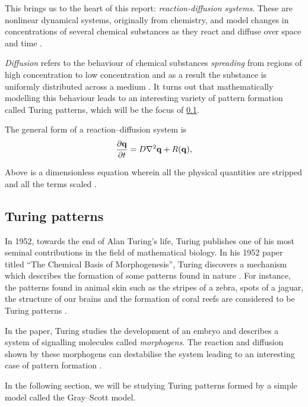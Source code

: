 \documentclass[a4paper, 11pt]{article}
\begin{document}
This brings us to the heart of this report: \emph{reaction-diffusion systems}. These are nonlinear dynamical systems, originally from chemistry, and model changes in concentrations of several chemical substances as they react and diffuse over space and time \parencite{turing1952}.

\emph{Diffusion} refers to the behaviour of chemical substances \textit{spreading} from regions of high concentration to low concentration and as a result the substance is uniformly distributed across a medium \parencite{britannicadiffusion}. It turns out that mathematically modelling this behaviour leads to an interesting variety of pattern formation called Turing patterns, which will be the focus of \cref{sec:turing-patterns}.

The general form of a reaction--diffusion system is
\begin{equation} \label{eq:rd-general}
	\frac{\partial \mathbf{q}}{\partial t} = D \nabla^2 \mathbf{q} + R(\mathbf{q}),
\end{equation}

Above is a dimensionless equation wherein all the physical quantities are stripped and all the terms scaled \parencite{strogatz}. 


\subsection{Turing patterns}
\label{sec:turing-patterns}

In 1952, towards the end of Alan Turing's life, Turing publishes one of his most seminal contributions in the field of mathematical biology. In his 1952 paper titled ``The Chemical Basis of Morphogenesis'', Turing discovers a mechanism which describes the formation of some patterns found in nature \parencite{turing1952}. For instance, the patterns found in animal skin such as the stripes of a zebra, spots of a jaguar, the structure of our brains and the formation of coral reefs are considered to be Turing patterns \parencite{sheffieldturing}.

In the paper, Turing studies the development of an embryo and describes a system of signalling molecules called \emph{morphogens}. The reaction and diffusion shown by these morphogens can destabilise the system leading to an interesting case of pattern formation \parencite{turing1952}.

In the following section, we will be studying Turing patterns formed by a simple model called the Gray--Scott model.
\end{document}

